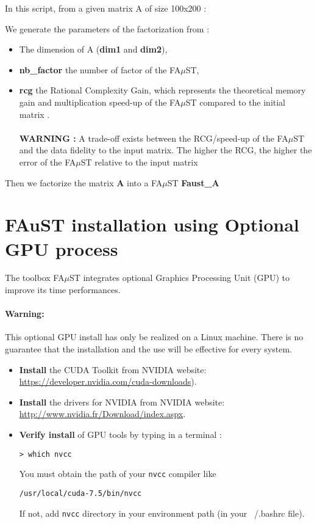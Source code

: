 In this script, from a given matrix A of size 100x200 :

We generate the parameters of the factorization from :
\begin{itemize}
\item The dimension of A (\textbf{dim1} and \textbf{dim2}),
\item \textbf{nb\_factor} the number of factor of the FA$\mu$ST,
\item \textbf{rcg} the Rational Complexity Gain, which represents the theoretical memory gain and multiplication speed-up of the FA$\mu$ST compared to the initial matrix .
\\ \\\textbf{WARNING :}  A trade-off exists between the RCG/speed-up of the FA$\mu$ST and the data fidelity to the input matrix.
The higher the RCG, the higher the error of the FA$\mu$ST relative to the input matrix
\end{itemize}

\lstset{style=customBash}

Then we factorize the matrix \textbf{A} into a FA$\mu$ST \textbf{Faust\_A}



\section{FAuST installation using Optional GPU process}\label{sec:OptionalGPU}
The toolbox FA$\mu$ST integrates optional Graphics Processing Unit (GPU) to improve its time performances.
\paragraph{Warning:} This optional GPU install has only be realized on a Linux machine. There is no guarantee that the installation and the use will be effective for every system.

\begin{itemize}
\item \textbf{Install} the CUDA Toolkit from NVIDIA website:\\
\url{https://developer.nvidia.com/cuda-downloads}).
\item \textbf{Install} the drivers for NVIDIA from NVIDIA website:\\ \url{http://www.nvidia.fr/Download/index.aspx}.
\item \textbf{Verify install} of GPU tools by typing in a terminal :
\lstset{style=customBash} 
\begin{lstlisting}
> which nvcc
\end{lstlisting}
You must obtain the path of your \texttt{nvcc} compiler like 
\begin{lstlisting}
/usr/local/cuda-7.5/bin/nvcc
\end{lstlisting}
If not, add \texttt{nvcc} directory in your environment path (in your ~/.bashrc file). 
\end{itemize}

